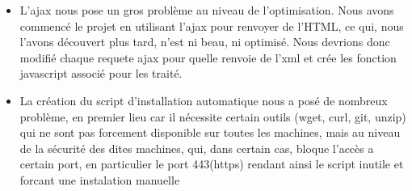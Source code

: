 \documentclass[a4paper,10pt]{report}
\begin{document}
\begin{itemize}
    \null
    
    \item L'ajax nous pose un gros probl\`eme au niveau de l'optimisation. Nous avons
    commenc\'e le projet en utilisant l'ajax pour renvoyer de l'HTML, ce qui, nous l'avons
    d\'ecouvert plus tard, n'est ni beau, ni optimis\'e. Nous devrions donc modifi\'e
    chaque requete ajax pour quelle renvoie de l'xml et cr\'ee les fonction javascript
    associ\'e pour les trait\'e.

    \null
    
    \item La cr\'eation du script d'installation automatique nous a pos\'e de nombreux
    probl\`eme, en premier lieu car il n\'ecessite certain outils (wget, curl, git, unzip)
    qui ne sont pas forcement disponible sur toutes les machines, mais au niveau de la
    s\'ecurit\'e des dites machines, qui, dans certain cas, bloque l'acc\`es a certain port, en
    particulier le port 443(https) rendant ainsi le script inutile et forcant une instalation
    manuelle
\end{itemize}
\end{document}
